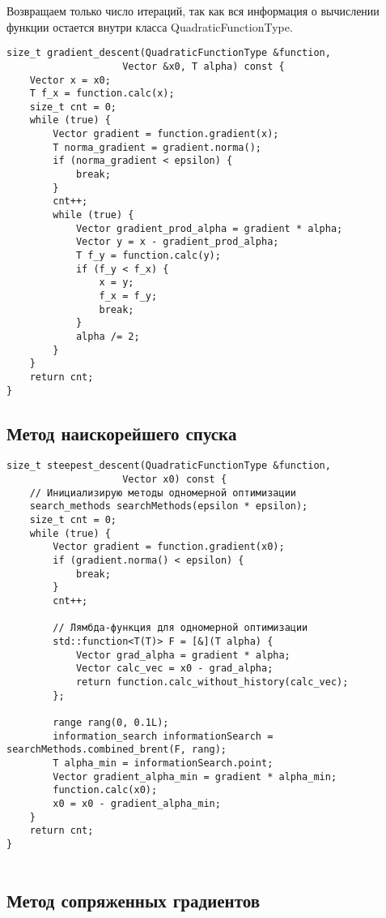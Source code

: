  Возвращаем только число итераций, так как вся информация о вычислении
 функции остается внутри класса QuadraticFunctionType.

\begin{lstlisting}
size_t gradient_descent(QuadraticFunctionType &function,
                    Vector &x0, T alpha) const {
    Vector x = x0;
    T f_x = function.calc(x);
    size_t cnt = 0;
    while (true) {
        Vector gradient = function.gradient(x);
        T norma_gradient = gradient.norma();
        if (norma_gradient < epsilon) {
            break;
        }
        cnt++;
        while (true) {
            Vector gradient_prod_alpha = gradient * alpha;
            Vector y = x - gradient_prod_alpha;
            T f_y = function.calc(y);
            if (f_y < f_x) {
                x = y;
                f_x = f_y;
                break;
            }
            alpha /= 2;
        }
    }
    return cnt;
}
\end{lstlisting}

\newpage


\subsection{Метод наискорейшего спуска}

\begin{lstlisting}
size_t steepest_descent(QuadraticFunctionType &function,
                    Vector x0) const {
    // Инициализирую методы одномерной оптимизации
    search_methods searchMethods(epsilon * epsilon); 
    size_t cnt = 0;
    while (true) {
        Vector gradient = function.gradient(x0);
        if (gradient.norma() < epsilon) {
            break;
        }
        cnt++;

        // Лямбда-функция для одномерной оптимизации
        std::function<T(T)> F = [&](T alpha) {
            Vector grad_alpha = gradient * alpha;
            Vector calc_vec = x0 - grad_alpha;
            return function.calc_without_history(calc_vec);
        };

        range rang(0, 0.1L);
        information_search informationSearch = searchMethods.combined_brent(F, rang);
        T alpha_min = informationSearch.point;
        Vector gradient_alpha_min = gradient * alpha_min;
        function.calc(x0);
        x0 = x0 - gradient_alpha_min;
    }
    return cnt;
}


\end{lstlisting}


\newpage
\subsection{Метод сопряженных градиентов}


